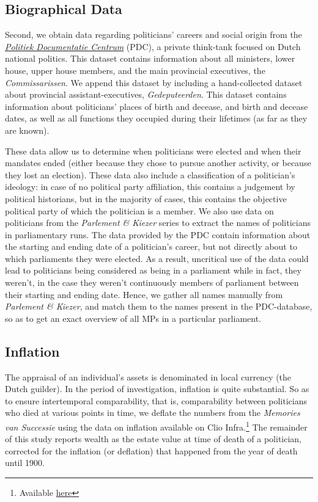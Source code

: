 \subsection{Biographical Data}
    Second, we obtain data regarding politicians' careers and social origin from the \href{www.pdc.nl}{\textit{Politiek Documentatie Centrum}} (PDC), a private think-tank focused on Dutch national politics. This dataset contains information about all ministers, lower house, upper house members, and the main provincial executives, the \textit{Commissarissen}. We append this dataset by including a hand-collected dataset about provincial assistant-executives, \textit{Gedeputeerden}. This dataset contains information about politicians' places of birth and decease, and birth and decease dates, as well as all functions they occupied during their lifetimes (as far as they are known). 

    These data allow us to determine when politicians were elected and when their mandates ended (either because they chose to pursue another activity, or because they lost an election). These data also include a classification of a politician's ideology: in case of no political party affiliation, this contains a judgement by political historians, but in the majority of cases, this contains the objective political party of which the politician is a member. 
    We also use data on politicians from the \textit{Parlement \& Kiezer} series to extract the names of politicians in parliamentary runs. The data provided by the PDC contain information about the starting and ending date of a politician's career, but not directly about to which parliaments they were elected. As a result, uncritical use of the data could lead to politicians being considered as being in a parliament while in fact, they weren't, in the case they weren't continuously members of parliament between their starting and ending date. Hence, we gather all names manually from \textit{Parlement \& Kiezer}, and match them to the names present in the PDC-database, so as to get an exact overview of all MPs in a particular parliament. 

\subsection{Inflation}
    The appraisal of an individual's assets is denominated in local currency (the Dutch guilder). In the period of investigation, inflation is quite substantial. So as to ensure intertemporal comparability, that is, comparability between politicians who died at various points in time, we deflate the numbers from the \textit{Memories van Successie} using the data on inflation available on Clio Infra.\footnote{Available \href{https://clio-infra.eu/Indicators/Inflation.html}{here}} The remainder of this study reports wealth as the estate value at time of death of a politician, corrected for the inflation (or deflation) that happened from the year of death until 1900. 

